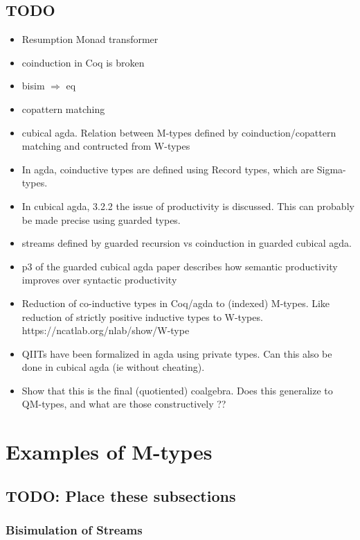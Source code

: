\documentclass[twoside,11pt,openright]{report}
\begin{document}
\section{TODO}
\begin{itemize}
\item Resumption Monad transformer
\item coinduction in Coq is broken
\item bisim \(\Rightarrow\) eq
\item copattern matching
\item cubical agda. Relation between M-types defined by coinduction/copattern matching and contructed from W-types
\item   In agda, coinductive types are defined using Record types, which are Sigma-types. 
\item   In cubical agda, 3.2.2 the issue of productivity is discussed. This can probably be made precise using guarded types.
\item streams defined by guarded recursion vs coinduction in guarded cubical agda. 
\item    p3 of the guarded cubical agda paper describes how semantic productivity improves over syntactic productivity
\item Reduction of co-inductive types in Coq/agda to (indexed) M-types. Like reduction of strictly positive inductive types to W-types. https://ncatlab.org/nlab/show/W-type
\item QIITs have been formalized in agda using private types. Can this also be done in cubical agda (ie without cheating).
\item   Show that this is the final (quotiented) coalgebra. Does this generalize to QM-types, and what are those constructively ??
\end{itemize}


\chapter{Examples of M-types}
\section{TODO: Place these subsections}
\subsection{Bisimulation of Streams}
\end{document}

